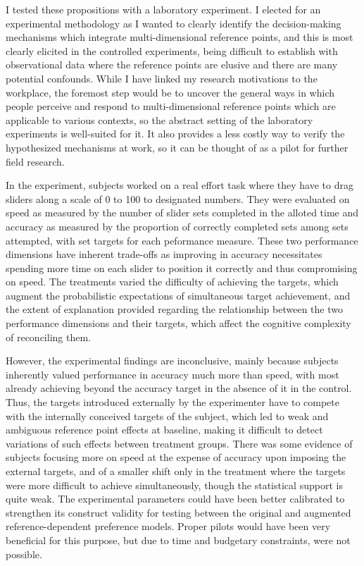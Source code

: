 \documentclass[12pt, letterpaper, DIV=11, numbers=noendperiod]{article}
\begin{document}
I tested these propositions with a laboratory experiment. I elected for an experimental methodology as I wanted to clearly identify the decision-making mechanisms which integrate multi-dimensional reference points, and this is most clearly elicited in the controlled experiments, being difficult to establish with observational data where the reference points are elusive and there are many potential confounds. While I have linked my research motivations to the workplace, the foremost step would be to uncover the general ways in which people perceive and respond to multi-dimensional reference points which are applicable to various contexts, so the abstract setting of the laboratory experiments is well-suited for it. It also provides a less costly way to verify the hypothesized mechanisms at work, so it can be thought of as a pilot for further field research.

In the experiment, subjects worked on a real effort task where they have to drag sliders along a scale of 0 to 100 to designated numbers. They were evaluated on speed as measured by the number of slider sets completed in the alloted time and accuracy as measured by the proportion of correctly completed sets among sets attempted, with set targets for each peformance measure. These two performance dimensions have inherent trade-offs as improving in accuracy necessitates spending more time on each slider to position it correctly and thus compromising on speed. The treatments varied the difficulty of achieving the targets, which augment the probabilistic expectations of simultaneous target achievement, and the extent of explanation provided regarding the relationship between the two performance dimensions and their targets, which affect the cognitive complexity of reconciling them.

However, the experimental findings are inconclusive, mainly because subjects inherently valued performance in accuracy much more than speed, with most already achieving beyond the accuracy target in the absence of it in the control. Thus, the targets introduced externally by the experimenter have to compete with the internally conceived targets of the subject, which led to weak and ambiguous reference point effects at baseline, making it difficult to detect variations of such effects between treatment groups. There was some evidence of subjects focusing more on speed at the expense of accuracy upon imposing the external targets, and of a smaller shift only in the treatment where the targets were more difficult to achieve simultaneously, though the statistical support is quite weak. The experimental parameters could have been better calibrated to strengthen its construct validity for testing between the original and augmented reference-dependent preference models. Proper pilots would have been very beneficial for this purpose, but due to time and budgetary constraints, were not possible.
\end{document}
